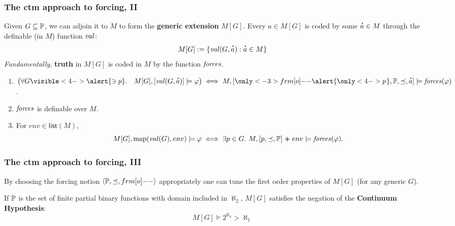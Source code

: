 \documentclass[english]{beamer}
\begin{document}
\begin{frame}
  \frametitle{The ctm approach to forcing, II}
  Given $G\subseteq \mathbb{P}$, we can adjoin it to $M$ to form the
  \textbf{generic extension} $M[G]$.
  \pause
  Every $a\in M[G]$ is coded by
  some $\punto{a}\in M$ through the definable (in $M$) function $\operatorname{\mathit{val}}$:
  \[
  M[G]\defi \{ \val(G,\punto{a}) : \punto{a}\in M\}
  \]
  \emph{Fundamentally}, \textbf{truth} in $M[G]$ is coded in $M$ by the
  function $\mathit{forces}$.
  \pause
  \begin{theorem}
    \begin{enumerate}
    \item $\bigl(\forall G\visible<4->{\alert{\ni p}}.\quad M[G], [\val(G,\punto{a})]
      \models \phi\bigr)
      \iff
      M,
      [\only<-3>{\1}\alert{\only<4->{p\hspace{0.2ex}}},\PP,\preceq,\punto{a}]\models
      \forceisa(\phi)$.
    \item $\mathit{forces}$ is definable over $M$.
      \pause%
      \pause%
      \pause%
    \item For $env\in\mathsf{list}(M)$,
      \[
      M[G], \mathrm{map}(\operatorname{\mathit{val}}(G),env) \models \varphi
      \iff
      \exists p\in G.\ M, [p,\preceq,\mathbb{P}] \mathbin{{+}\!\!\!\!{+}} env \models
      \mathit{forces}(\varphi).
      \]
    \end{enumerate}
  \end{theorem} 
\end{frame}

\begin{frame}
  \frametitle{The ctm approach to forcing, III}
  By choosing the forcing notion $\lb \PP, {\preceq} ,\1\rb$
  appropriately one can tune the first order properties of  $M[G]$ (for
  any generic $G$).
  \pause
  \begin{theorem}
    If $\mathbb{P}$ is the set of finite partial binary functions with domain
    included in $\aleph_2$, $M[G]$ satisfies the negation of the
    \textbf{Continuum Hypothesis}:
    \[
    M[G] \models 2^{\aleph_0} >\aleph_1
    \]
  \end{theorem}
\end{frame}
\end{document}
